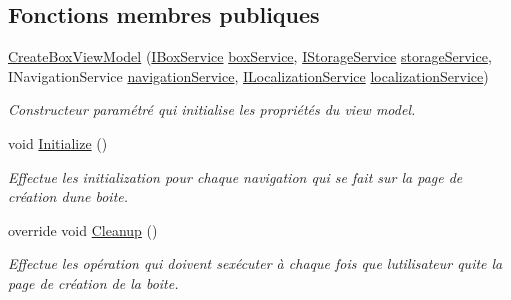\subsection*{Fonctions membres publiques}
\begin{DoxyCompactItemize}
\item 
\hyperlink{class_boxes_1_1_view_models_1_1_create_box_view_model_aea2ee0e86d34e068fdc7acef9606e6c0}{Create\+Box\+View\+Model} (\hyperlink{interface_boxes_1_1_services_1_1_box_1_1_i_box_service}{I\+Box\+Service} \hyperlink{class_boxes_1_1_view_models_1_1_create_box_view_model_a8be21e46beb28538d8b26af0d44f38f8}{box\+Service}, \hyperlink{interface_boxes_1_1_services_1_1_storage_1_1_i_storage_service}{I\+Storage\+Service} \hyperlink{class_boxes_1_1_view_models_1_1_create_box_view_model_a2aaf62134a95ddf88ddc76c25034507e}{storage\+Service}, I\+Navigation\+Service \hyperlink{class_boxes_1_1_view_models_1_1_create_box_view_model_a221f3343f2eb1a4016c0e70705b75245}{navigation\+Service}, \hyperlink{interface_boxes_1_1_services_1_1_localization_1_1_i_localization_service}{I\+Localization\+Service} \hyperlink{class_boxes_1_1_view_models_1_1_create_box_view_model_a050aeaedf44bac7ae4299524e5c96657}{localization\+Service})
\begin{DoxyCompactList}\small\item\em Constructeur paramétré qui initialise les propriétés du view model. \end{DoxyCompactList}\item 
void \hyperlink{class_boxes_1_1_view_models_1_1_create_box_view_model_a798a061e2ad60d1f7ba7fa8e184b2987}{Initialize} ()
\begin{DoxyCompactList}\small\item\em Effectue les initialization pour chaque navigation qui se fait sur la page de création d\textquotesingle{}une boite. \end{DoxyCompactList}\item 
override void \hyperlink{class_boxes_1_1_view_models_1_1_create_box_view_model_a795bf5e6be7e6f889a587bbc548f2e72}{Cleanup} ()
\begin{DoxyCompactList}\small\item\em Effectue les opération qui doivent s\textquotesingle{}exécuter à chaque fois que l\textquotesingle{}utilisateur quite la page de création de la boite. \end{DoxyCompactList}\end{DoxyCompactItemize}
